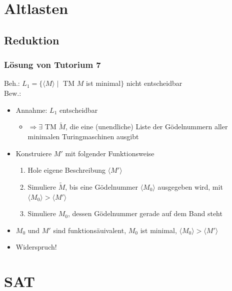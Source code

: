 




\section{Altlasten}
\subsection{Reduktion}
\begin{frame}
\frametitle{Lösung von Tutorium 7}
Beh.: $L_1 = \{\langle M \rangle \mid$ TM $M$ ist minimal$\}$ nicht entscheidbar~\\
Bew.:
\begin{itemize}
	\item Annahme: $L_1$ entscheidbar
	\begin{itemize}
		\item $\Rightarrow \exists$ TM $\tilde{M}$, die eine (unendliche) Liste der Gödelnummern aller minimalen Turingmaschinen ausgibt 
	\end{itemize}
	\item Konstruiere $M'$ mit folgender Funktionsweise
	\begin{enumerate}
		\item Hole eigene Beschreibung $\langle M' \rangle$
		\item Simuliere $\tilde{M}$, bis eine Gödelnummer $\langle M_0 \rangle$ ausgegeben wird, mit $\langle M_0 \rangle > \langle M'\rangle$
		\item Simuliere $M_0$, dessen Gödelnummer gerade auf dem Band steht
	\end{enumerate}
	\item $M_0$ und $M'$ sind funktionsäuivalent, $M_0$ ist minimal, $\langle M_0 \rangle > \langle M'\rangle$
	\item Widerspruch!
\end{itemize}
\end{frame}

\section{SAT}
